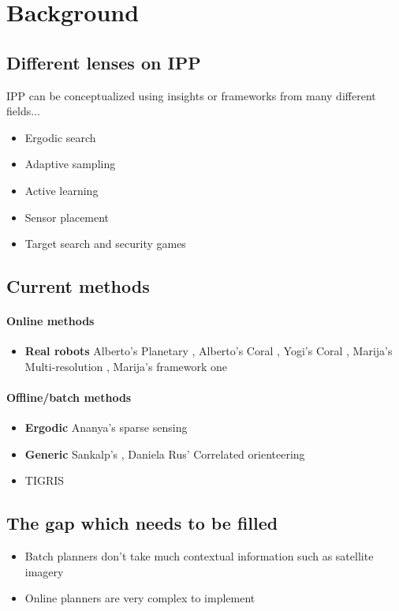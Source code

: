 
\chapter{Background} \label{chapBackground}

\section{Different lenses on IPP}
IPP can be conceptualized using insights or frameworks from many different fields...
\begin{itemize}
    \item Ergodic search
    \item Adaptive sampling
    \item Active learning 
    \item Sensor placement
    \item Target search and security games
\end{itemize}

\section{Current methods}
\subsubsection{Online methods}
\begin{itemize}
    \item \textbf{Real robots} Alberto's Planetary \cite{Kodgule2019Non-myopicMeasurements}, Alberto's Coral \cite{Candela2021}, Yogi's Coral \cite{Jamieson2020ActiveEnvironments}, Marija's Multi-resolution \cite{Stache2021AdaptiveSegmentation}, Marija's framework one \cite{Popovic2020}
\end{itemize}


\subsubsection{Offline/batch methods}
\begin{itemize}
    \item \textbf{Ergodic} Ananya's sparse sensing \cite{RaoSparseOptimization}
    \item \textbf{Generic} Sankalp's \cite{Arora2017RandomizedConstraints}, Daniela Rus' Correlated orienteering \cite{Yu2016CorrelatedTasks}
    \item TIGRIS \cite{Moon2022}
\end{itemize}

\section{The gap which needs to be filled}
\begin{itemize}
    \item Batch planners don't take much contextual information such as satellite imagery 
    \item Online planners are very complex to implement
\end{itemize}

